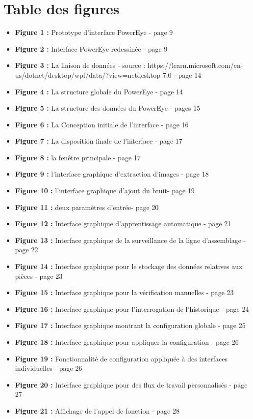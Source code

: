 \chapter*{Table des figures} %

\begin{itemize}
\item \textbf{Figure 1 :} Prototype d’interface PowerEye - page 9
\item \textbf{Figure 2 :} Interface PowerEye redessinée - page 9
\item \textbf{Figure 3 :}  La liaison de données - source : https://learn.microsoft.com/en-us/dotnet/desktop/wpf/data/?view=netdesktop-7.0 - page 14
\item \textbf{Figure 4 :} La structure globale du PowerEye - page 14
\item \textbf{Figure 5 :} La structure des données du PowerEye - pages 15
\item \textbf{Figure 6 :} La Conception initiale de l’interface - page 16
\item \textbf{Figure 7 :} La disposition finale de l’interface - page 17
\item \textbf{Figure 8 :} la fenêtre principale - page 17
\item \textbf{Figure 9 :} l’interface graphique d’extraction d’images - page 18
\item \textbf{Figure 10 :} l’interface graphique d’ajout du bruit- page 19
\item \textbf{Figure 11 :} deux paramètres d’entrée- page 20
\item \textbf{Figure 12 :} Interface graphique d’apprentissage automatique - page 21
\item \textbf{Figure 13 :} Interface graphique de la surveillance de la ligne d’assemblage - page 22
\item \textbf{Figure 14 :}  Interface graphique pour le stockage des données relatives aux pièces - page 23
\item \textbf{Figure 15 :} Interface graphique pour la vérification manuelles - page 23
\item \textbf{Figure 16 :} Interface graphique pour l’interrogation de l’historique - page 24
\item \textbf{Figure 17 :} Interface graphique montrant la configuration globale - page 25
\item \textbf{Figure 18 :} Interface graphique pour appliquer la configuration - page 26
\item \textbf{Figure 19 :} Fonctionnalité de configuration appliquée à des interfaces individuelles - page 26
\item \textbf{Figure 20 :} Interface graphique pour des flux de travail personnalisés - page 27
\item \textbf{Figure 21 :}  Affichage de l’appel de fonction - page 28
\end{itemize}